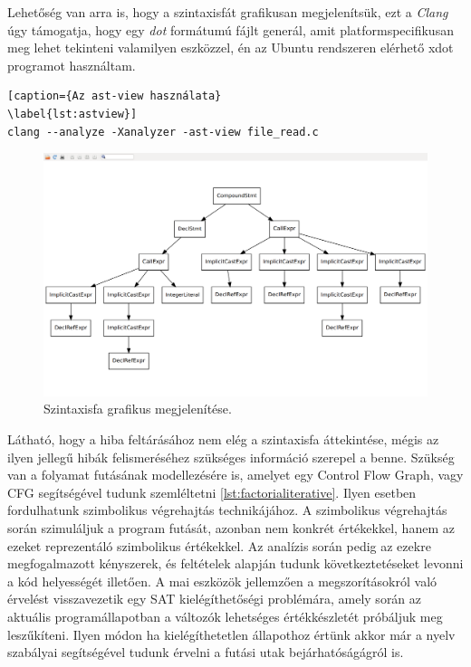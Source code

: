 \documentclass[a4paper,12pt]{report}
\begin{document}
Lehetőség van arra is, hogy a szintaxisfát grafikusan megjelenítsük, ezt a \emph{Clang} úgy támogatja, hogy egy \emph{dot} formátumú fájlt generál, amit platformspecifikusan meg lehet tekinteni valamilyen eszközzel, én az Ubuntu rendszeren elérhető xdot programot használtam.
\begin{lstlisting}[caption={Az ast-view használata}
\label{lst:astview}]
clang --analyze -Xanalyzer -ast-view file_read.c
\end{lstlisting}

\begin{figure}[h]
\caption{Szintaxisfa grafikus megjelenítése.}
\centering
\includegraphics[scale=0.2]{astview.png}
\end{figure}

Látható, hogy a hiba feltárásához nem elég a szintaxisfa áttekintése, mégis az ilyen jellegű hibák felismeréséhez szükséges információ szerepel a benne. Szükség van a folyamat futásának modellezésére is, amelyet egy Control Flow Graph, vagy CFG segítségével tudunk szemléltetni \ref{lst:factorialiterative}. Ilyen esetben fordulhatunk szimbolikus végrehajtás technikájához. A szimbolikus végrehajtás során szimuláljuk a program futását, azonban nem konkrét értékekkel, hanem az ezeket reprezentáló szimbolikus értékekkel. Az analízis során pedig az ezekre megfogalmazott kényszerek, és feltételek alapján tudunk következtetéseket levonni a kód helyességét illetően. A mai eszközök jellemzően a megszorításokról való érvelést visszavezetik egy SAT kielégíthetőségi problémára, amely során az aktuális programállapotban a változók lehetséges értékkészletét próbáljuk meg leszűkíteni. Ilyen módon ha kielégíthetetlen állapothoz értünk akkor már a nyelv szabályai segítségével tudunk érvelni a futási utak bejárhatóságágról is.
\end{document}
